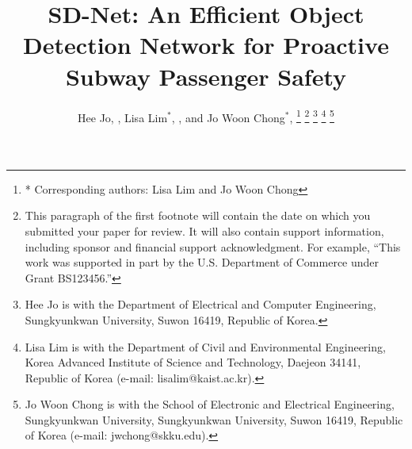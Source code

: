 \documentclass[journal,twoside,web]{ieeecolor}
\begin{document}
\begin{acronym}
\end{acronym}

\title{SD-Net: An Efficient Object Detection Network for Proactive Subway Passenger Safety}

\author{
    Hee Jo, , 
    Lisa Lim$^{*}$, ,
    and Jo Woon Chong$^{*}$, 
    \thanks{* Corresponding authors: Lisa Lim and Jo Woon Chong}
    \thanks{This paragraph of the first footnote will contain the date on which you submitted your paper for review. It will also contain support information, including sponsor and financial support acknowledgment. For example, ``This work was supported in part by the U.S. Department of Commerce under Grant BS123456.'' }
    \thanks{Hee Jo is with the Department of Electrical and Computer Engineering, Sungkyunkwan University, Suwon 16419, Republic of Korea.}
    \thanks{Lisa Lim is with the Department of Civil and Environmental Engineering, Korea Advanced Institute of Science and Technology, Daejeon 34141, Republic of Korea (e-mail: lisalim@kaist.ac.kr).}
    \thanks{Jo Woon Chong is with the School of Electronic and Electrical Engineering, Sungkyunkwan University, Sungkyunkwan University, Suwon 16419, Republic of Korea (e-mail: jwchong@skku.edu).}
}
\end{document}
